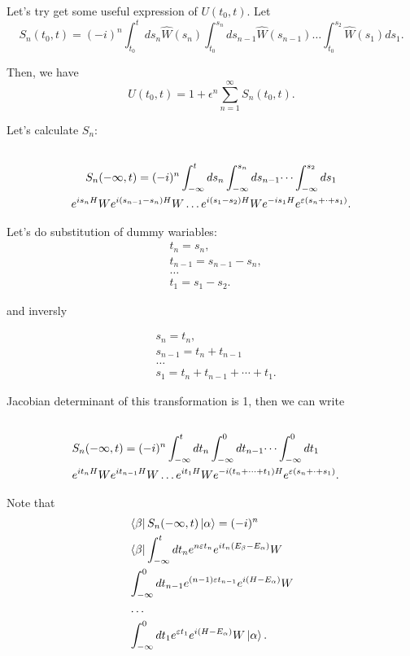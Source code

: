 \documentclass[main.tex]{subfiles}
\begin{document}
Let's try get some useful expression of $U(t_0, t)$.
Let
\begin{equation}
S_n(t_0, t) =  (-i)^n \int_{t_0}^t ds_n \hat{W}(s_n) \int_{t_0}^{s_n} ds_{n - 1} \hat{W}(s_{n-1})\dots \int_{t_0}^{s_2} \hat{W}(s_1)ds_1.
\end{equation}

Then, we have
\begin{equation}
U(t_0, t) = 1 + \epsilon^n \sum_{n=1}^\infty S_n (t_0, t).
\end{equation}

Let's calculate $S_n$:
\begin{multline}\\
S_n(-\infty, t) = (-i)^n \int_{-\infty}^t ds_n \int_{-\infty}^{s_n} ds_{n - 1}\dots \int_{-\infty}^{s_2} ds_1\\
e^{is_nH}We^{i(s_{n-1} - s_n)H}W \dots e^{i(s_1 - s_2)H}We^{-is_1H}e^{\eepsilon(s_n + \cdot + s_1)}.
\end{multline}

Let's do substitution of dummy wariables:
\begin{align*}
&t_n = s_n,\\
&t_{n-1} = s_{n-1} - s_n,\\
&\dots\\
&t_1 = s_1 - s_2.
\end{align*} 

and inversly

\begin{align*}
&s_n =t_n,\\
&s_{n-1} = t_n + t_{n-1}\\
&\dots\\
&s_1 = t_n + t_{n-1} + \cdots + t_1.
\end{align*}

Jacobian determinant of this transformation is 1, then we can write
\begin{align*}\\
&S_n(-\infty, t) = (-i)^n \int_{-\infty}^t dt_n \int_{-\infty}^{0} dt_{n - 1}\dots \int_{-\infty}^{0} dt_1\\
&e^{it_nH}We^{it_{n-1}H}W \dots e^{it_1H}We^{-i(t_n + \cdots + t_1)H}e^{\eepsilon(s_n + \cdot + s_1)}.
\end{align*}

Note that
\begin{align*}
&\bra{\beta}S_n (-\infty, t) \ket{\alpha} = (-i)^n \\
& \bra{\beta} \int^t_{-\infty} dt_n e^{n\eepsilon t_{n}} e^{it_n(E_{\beta} - E_{\alpha})} W\\
& \int^0_{-\infty}dt_{n-1} e^{(n - 1)\eepsilon t_{n - 1}}e^{i(H - E_\alpha)} W\\
& \dots \\
&\int^0_{-\infty}dt_{1} e^{\eepsilon t_1}e^{i(H - E_\alpha)} W \ket{\alpha}.
\end{align*} 
\end{document}
